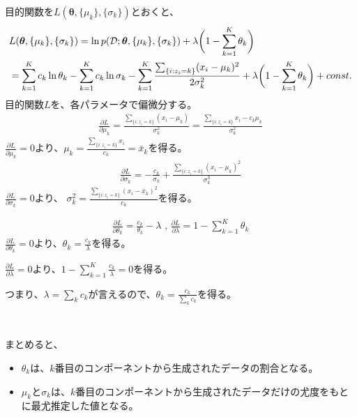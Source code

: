 \documentclass[aspectratio=169,unicode,dvipdfmx,14pt]{beamer}
\begin{document}
\begin{frame}
\FontMath
\vspace{.1in}
目的関数を$L(\bm{\theta},\{ \mu_k \}, \{ \sigma_k \})$とおくと、
\begin{align}
& L(\bm{\theta},\{ \mu_k \}, \{ \sigma_k \})
= \ln p(\mathcal{D};\bm{\theta},\{ \mu_k \}, \{ \sigma_k \}) 
+ \lambda \bigg( 1 - \sum_{k=1}^K \theta_k \bigg)
\notag \\ &
= \sum_{k=1}^K c_k \ln \theta_k - \sum_{k=1}^K c_k \ln \sigma_k
- \sum_{k=1}^K \frac{\sum_{ \{ i : z_i = k \} } (x_i - \mu_k)^2}{ 2\sigma_k^2} + \lambda \bigg( 1 - \sum_{k=1}^K \theta_k \bigg) + const.
\end{align}
目的関数$L$を、各パラメータで偏微分する。
\begin{align}
\frac{\partial L}{\partial \mu_k} = \frac{ \sum_{ \{ i : z_i = k \} } (x_i - \mu_k) }{\sigma_k^2}
= \frac{ \sum_{ \{ i : z_i = k \} } x_i - c_k \mu_k }{\sigma_k^2}
\end{align}
$\frac{\partial L}{\partial \mu_k} = 0$より、$\mu_k = \frac{ \sum_{ \{ i : z_i = k \} } x_i }{ c_k } = \bar{x}_k$を得る。
\begin{align}
\frac{\partial L}{\partial \sigma_k} = - \frac{c_k}{\sigma_k} + \frac{\sum_{ \{ i : z_i = k \} } (x_i - \mu_k)^2}{ \sigma_k^3}
\end{align}
$\frac{\partial L}{\partial \sigma_k} = 0$より、
$\sigma_k^2 = \frac{\sum_{ \{ i : z_i = k \} } (x_i - \bar{x}_k)^2}{ c_k}$を得る。
\end{frame}

\begin{frame}
\FontMath
\begin{align}
\frac{\partial L}{\partial \theta_k} = \frac{c_k}{\theta_k} - \lambda \mbox{ , \ }
\frac{\partial L}{\partial \lambda} = 1 - \sum_{k=1}^K \theta_k
\end{align}
$\frac{\partial L}{\partial \theta_k} = 0$より、$\theta_k = \frac{c_k}{\lambda}$を得る。

$\frac{\partial L}{\partial \lambda} = 0$より、$1 - \sum_{k=1}^K \frac{c_k}{\lambda} = 0$を得る。

つまり、$\lambda = \sum_k c_k$が言えるので、$\theta_k = \frac{c_k}{\sum_k c_k}$を得る。

\

まとめると、
\begin{itemize}
\item $\theta_k$は、$k$番目のコンポーネントから生成されたデータの割合となる。
\item $\mu_k$と$\sigma_k$は、$k$番目のコンポーネントから生成されたデータだけの尤度をもとに最尤推定した値となる。
\end{itemize}
\end{frame}
\end{document}
